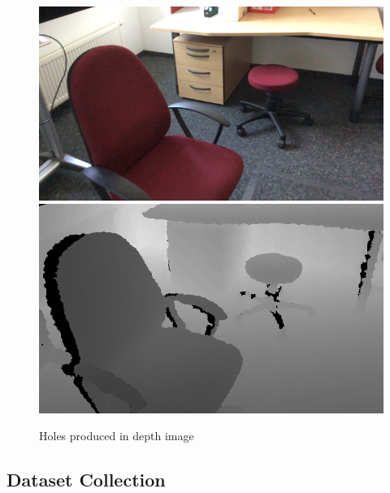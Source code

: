 \begin{figure}[!]
\centering
    \includegraphics[scale=0.29]{Figures/RGB.png} \includegraphics[scale=0.37]{Figures/Depth.png}
    \caption{Holes produced in depth image}
    \label{fig:holes2}
\end{figure}


\subsection{Dataset Collection}

